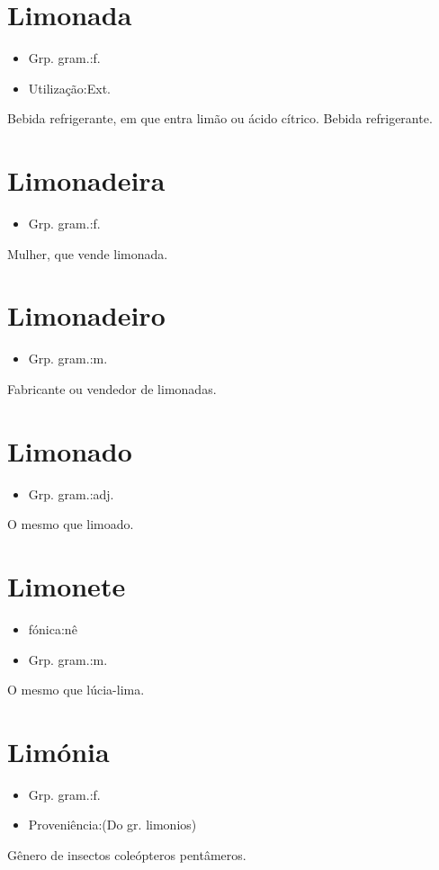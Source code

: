 \section{Limonada}
\begin{itemize}
\item {Grp. gram.:f.}
\end{itemize}
\begin{itemize}
\item {Utilização:Ext.}
\end{itemize}
Bebida refrigerante, em que entra limão ou ácido cítrico.
Bebida refrigerante.
\section{Limonadeira}
\begin{itemize}
\item {Grp. gram.:f.}
\end{itemize}
Mulher, que vende limonada.
\section{Limonadeiro}
\begin{itemize}
\item {Grp. gram.:m.}
\end{itemize}
Fabricante ou vendedor de limonadas.
\section{Limonado}
\begin{itemize}
\item {Grp. gram.:adj.}
\end{itemize}
O mesmo que \textunderscore limoado\textunderscore .
\section{Limonete}
\begin{itemize}
\item {fónica:nê}
\end{itemize}
\begin{itemize}
\item {Grp. gram.:m.}
\end{itemize}
O mesmo que \textunderscore lúcia-lima\textunderscore .
\section{Limónia}
\begin{itemize}
\item {Grp. gram.:f.}
\end{itemize}
\begin{itemize}
\item {Proveniência:(Do gr. \textunderscore limonios\textunderscore )}
\end{itemize}
Gênero de insectos coleópteros pentâmeros.
